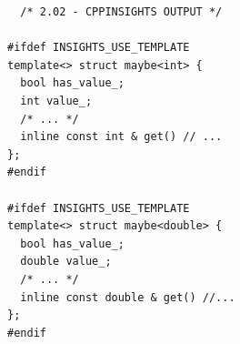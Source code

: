 \begin{verbatim}
  /* 2.02 - CPPINSIGHTS OUTPUT */

#ifdef INSIGHTS_USE_TEMPLATE
template<> struct maybe<int> {
  bool has_value_;
  int value_;
  /* ... */
  inline const int & get() // ...
};
#endif

#ifdef INSIGHTS_USE_TEMPLATE
template<> struct maybe<double> {
  bool has_value_;
  double value_;
  /* ... */
  inline const double & get() //...
};
#endif
\end{verbatim}